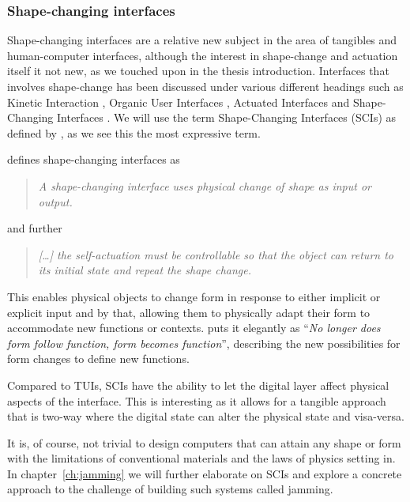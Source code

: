 \subsubsection{Shape-changing interfaces}
Shape-changing interfaces are a relative new subject in the area of tangibles and human-computer interfaces, although the interest in shape-change and actuation itself it not new, as we touched upon in the thesis introduction.
Interfaces that involves shape-change has been discussed under various different headings such as Kinetic Interaction \citep{parkes2008designing}, Organic User Interfaces \citep{parkes2008designing,holman2008organic}, Actuated Interfaces \citep{poupyrev2007actuation} and Shape-Changing Interfaces \citep{coelho2011shape,rasmussen2012shape}.
We will use the term Shape-Changing Interfaces (SCIs) as defined by \citeauthor{rasmussen2012shape}, as we see this the most expressive term.

\citeauthor{rasmussen2012shape} defines shape-changing interfaces as
\begin{quotation}
  \emph{A shape-changing interface uses physical change of shape as input or output.}
\end{quotation}
and further
\begin{quotation}
  \emph{[\ldots] the self-actuation must be controllable so that the object can return to its initial state and repeat the shape change. }  
\end{quotation}

This enables physical objects to change form in response to either implicit or explicit input and by that, allowing them to physically adapt their form to accommodate new functions or contexts.
\citep{parkes2008designing} puts it elegantly as ``\emph{No longer does form follow function, form becomes function}'', describing the new possibilities for form changes to define new functions.

Compared to TUIs, SCIs have the ability to let the digital layer affect physical aspects of the interface.
This is interesting as it allows for a tangible approach that is two-way where the digital state can alter the physical state and visa-versa.

It is, of course, not trivial to design computers that can attain any shape or form with the limitations of conventional materials and the laws of physics setting in.
In chapter~\ref{ch:jamming} we will further elaborate on SCIs and explore a concrete approach to the challenge of building such systems called jamming.

